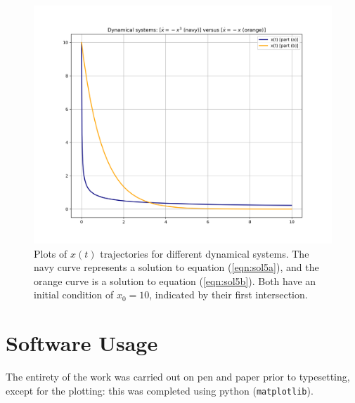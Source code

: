 \documentclass[draft]{agujournal2019}
\begin{document}
\begin{figure}[t]
    \centering
    \includegraphics[width=0.85\linewidth]{figures/plot_xt.png}
    \caption{Plots of $x(t)$ trajectories for different dynamical systems. The navy curve represents a solution to equation (\ref{eqn:sol5a}), and the orange curve is a solution to equation (\ref{eqn:sol5b}). Both have an initial condition of $x_0=10$, indicated by their first intersection. }
    \label{fig:3}
\end{figure}



\section{Software Usage}
The entirety of the work was carried out on pen and paper prior to typesetting, except for the plotting: this was completed using python (\verb|matplotlib|). 

\newpage















%
\end{document}
